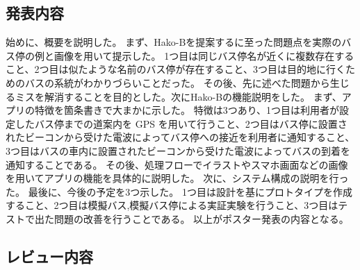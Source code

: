 \documentclass[openany,11pt,papersize]{jsbook}
\begin{document}

\subsection{発表内容}
始めに、概要を説明した。
まず、Hako-Bを提案するに至った問題点を実際のバス停の例と画像を用いて提示した。
1つ目は同じバス停名が近くに複数存在すること、2つ目は似たような名前のバス停が存在すること、3つ目は目的地に行くためのバスの系統がわかりづらいことだった。
その後、先に述べた問題から生じるミスを解消することを目的とした。次にHako-Bの機能説明をした。
まず、アプリの特徴を箇条書きで大まかに示した。
特徴は3つあり、1つ目は利用者が設定したバス停までの道案内を GPS を用いて行うこと、2つ目はバス停に設置されたビーコンから受けた電波によってバス停への接近を利用者に通知すること、3つ目はバスの車内に設置されたビーコンから受けた電波によってバスの到着を通知することである。
その後、処理フローでイラストやスマホ画面などの画像を用いてアプリの機能を具体的に説明した。
次に、システム構成の説明を行った。
最後に、今後の予定を3つ示した。
1つ目は設計を基にプロトタイプを作成すること、2つ目は模擬バス,模擬バス停による実証実験を行うこと、3つ目はテストで出た問題の改善を行うことである。
以上がポスター発表の内容となる。


\subsection{レビュー内容}
\end{document}
